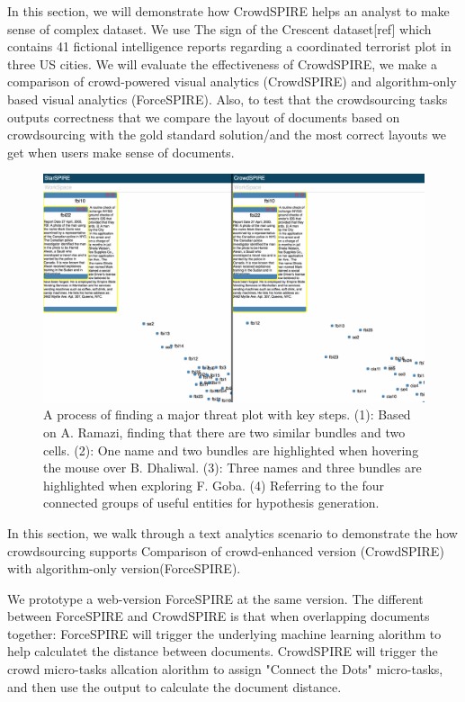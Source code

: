 \documentclass[journal]{vgtc}                %
\begin{document}
In this section, we will demonstrate how CrowdSPIRE helps an analyst to make sense of complex dataset.
We use The sign of the Crescent dataset[ref] which contains 41 fictional intelligence reports regarding a coordinated terrorist plot in three US cities.
We will evaluate the effectiveness of CrowdSPIRE, we make a comparison of crowd-powered visual analytics (CrowdSPIRE) and algorithm-only based visual analytics (ForceSPIRE).
Also, to test that the crowdsourcing tasks outputs correctness that we compare the layout of documents based on crowdsourcing with the gold standard solution/and the most correct layouts we get when users make sense of documents.
\begin{figure}
 \centering
  \includegraphics[width=\textwidth]{Case}
 \caption{A process of finding a major threat plot with key steps. (1): Based on A. Ramazi, finding that there are two similar bundles and two cells. (2): One name and two bundles are highlighted when hovering the mouse over B. Dhaliwal. (3): Three names and three bundles are highlighted when exploring F. Goba. (4) Referring to the four connected groups of useful entities for hypothesis generation.}
 \label{fig:case}
\end{figure}

In this section, we walk through a text analytics scenario to demonstrate the how crowdsourcing supports
Comparison of crowd-enhanced version (CrowdSPIRE) with algorithm-only version(ForceSPIRE).

We prototype a web-version ForceSPIRE at the same version.
The different between ForceSPIRE and CrowdSPIRE is that when overlapping documents together:
ForceSPIRE will trigger the underlying machine learning alorithm to help calculatet the distance between documents.
CrowdSPIRE will trigger the crowd micro-tasks allcation alorithm to assign "Connect the Dots" micro-tasks, and then use the output to calculate the document distance.
\end{document}
